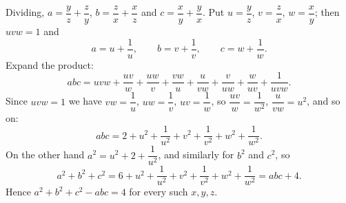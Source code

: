 Dividing, $a=\dfrac yz+\dfrac zy$, $b=\dfrac zx+\dfrac xz$ and $c=\dfrac xy+\dfrac yx$. Put $u=\dfrac yz$, $v=\dfrac zx$, $w=\dfrac xy$; then $uvw=1$ and
\[a=u+\dfrac1u,\qquad b=v+\dfrac1v,\qquad c=w+\dfrac1w.\]
Expand the product:
\[abc=uvw+\dfrac{uv}{w}+\dfrac{uw}{v}+\dfrac{vw}{u}+\dfrac{u}{vw}+\dfrac{v}{uw}+\dfrac{w}{uv}+\dfrac{1}{uvw}.\]
Since $uvw=1$ we have $vw=\dfrac1u$, $uw=\dfrac1v$, $uv=\dfrac1w$, so $\dfrac{uv}{w}=\dfrac1{w^2}$, $\dfrac{u}{vw}=u^2$, and so on:
\[abc=2+u^2+\dfrac1{u^2}+v^2+\dfrac1{v^2}+w^2+\dfrac1{w^2}.\]
On the other hand $a^2=u^2+2+\dfrac1{u^2}$, and similarly for $b^2$ and $c^2$, so
\[a^2+b^2+c^2=6+u^2+\dfrac1{u^2}+v^2+\dfrac1{v^2}+w^2+\dfrac1{w^2}=abc+4.\]
Hence $a^2+b^2+c^2-abc=\boxed{4}$ for every such $x,y,z$.
